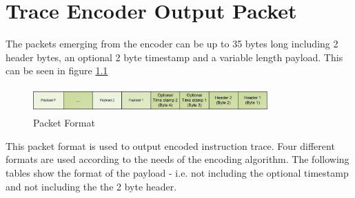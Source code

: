 \chapter{Trace Encoder Output Packet}

The packets emerging from the encoder can be up to 35 bytes long
including 2 header bytes, an optional 2 byte timestamp and a variable
length payload. This can be seen in figure \ref{fig:packet-format}

\begin{figure}[h]
\begin{center}
  \includegraphics[height=1cm, width=9cm]{packet.jpg}
  \caption{Packet Format}
  \label{fig:packet-format}
\end{center}
\end{figure}


This packet format is used to output encoded instruction
trace.  Four different formats are used according to the needs of the
encoding algorithm. The following tables show the format of the
payload - i.e. not including the optional timestamp and not including
the the 2 byte header.

